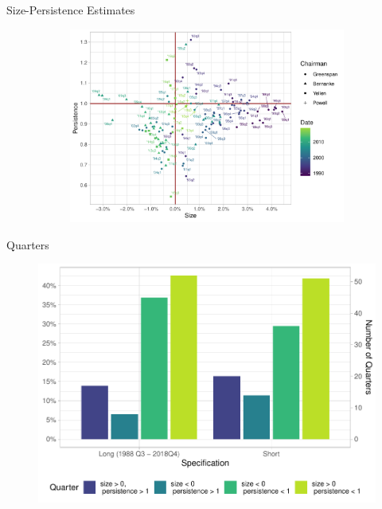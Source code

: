 \documentclass[10pt,aspectratio=169]{beamer}
\begin{document}
\begin{frame}{Size-Persistence Estimates}
\begin{figure}[!hpbt]
\begin{minipage}{\textwidth}
\begin{subfigure}[b]{0.5\textwidth}
            \includegraphics[width=\linewidth]{actual_size_persistence_long.pdf}
          \end{subfigure}
          \end{minipage}
      \end{figure}
    
\end{frame}

\begin{frame}{Quarters}
    \begin{figure}[!hpbt]\centering
        \begin{minipage}{.6\textwidth}\centering
           \includegraphics[width=\textwidth]{quarter_stats.pdf}
          \end{minipage}
      \end{figure}
\end{frame}
\end{document}
